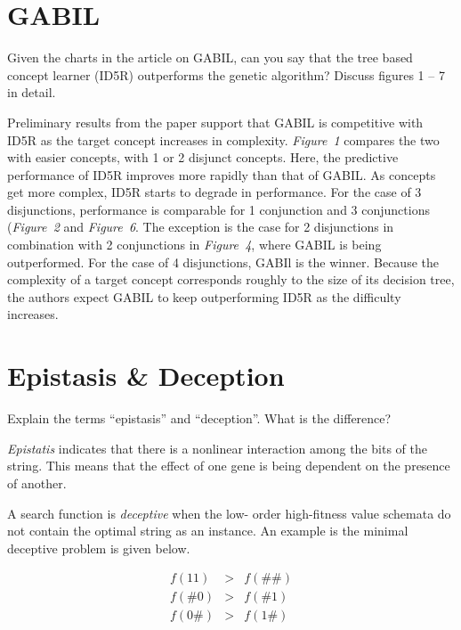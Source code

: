\documentclass[../main.tex]{subfiles}
\begin{document}
\section{GABIL}
\begin{question}
Given the charts in the article on GABIL, can you say that the tree based concept learner (ID5R) outperforms the
genetic algorithm? Discuss figures 1 -- 7 in detail.
\end{question}
\begin{solution}
Preliminary results from the paper support that GABIL is competitive with ID5R as the target concept increases in
complexity.
\emph{Figure~1} compares the two with easier concepts, with 1 or 2 disjunct concepts. Here, the predictive
performance of ID5R improves more rapidly than that of GABIL. As concepts get more complex, ID5R starts to degrade in
performance. For the case of 3 disjunctions, performance is comparable for  1 conjunction and 3 conjunctions
(\emph{Figure~2} and \emph{Figure~6}. The exception is the case for 2 disjunctions in combination with 2
conjunctions in \emph{Figure~4}, where GABIL is being outperformed. For the case of 4 disjunctions, GABIl is the
winner. Because the complexity of a target concept corresponds roughly to the size of its decision tree, the authors
expect GABIL to keep outperforming ID5R as the difficulty increases.
\end{solution}

\section{Epistasis \& Deception}
\begin{question}
Explain the terms ``epistasis'' and ``deception''. What is the difference?
\end{question}
\begin{solution}
\emph{Epistatis} indicates that there is a nonlinear interaction among the bits of the string. This means that the
effect of one gene is being dependent on the presence of another.

A search function is \emph{deceptive} when the low- order high-fitness value schemata do not contain the optimal string
as an instance. An example is the minimal deceptive problem is given below.

\begin{equation}
    \begin{array}{lcl}
        f(11)  & > & f(\#\#) \\
        f(\#0) & > & f(\#1) \\
        f(0\#) & > & f(1\#)
    \end{array}
\end{equation}

\end{solution}
\end{document}
